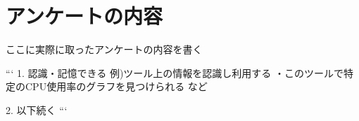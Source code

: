 \section{アンケートの内容}
ここに実際に取ったアンケートの内容を書く

```
1. 認識・記憶できる
例)ツール上の情報を認識し利用する
・このツールで特定のCPU使用率のグラフを見つけられる
など

2.
以下続く
```
